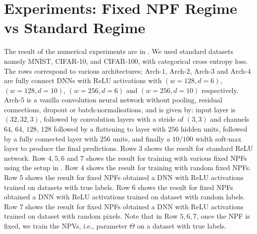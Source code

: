 \section{Experiments: Fixed NPF Regime vs  Standard Regime}\label{sec:generalisation}
The result of the numerical experiments are in . We used standard datasets namely MNIST, CIFAR-10, and CIFAR-100, with categorical cross entropy loss. The rows correspond to various architectures; Arch-$1$, Arch-$2$, Arch-$3$ and Arch-$4$ are fully connect DNNs with ReLU activations with $(w=128,d=6)$, $(w=128,d=10)$, $(w=256,d=6)$ and $(w=256,d=10)$ respectively. Arch-$5$ is a vanilla convolution neural network without pooling, residual connections, dropout or batch-normalisations, and is given by: input layer is $(32, 32, 3)$, followed by convolution layers with a stride of $(3, 3)$ and channels $64$, $64$, $128$, $128$ followed by a flattening to layer with $256$ hidden units, followed by a fully connected layer with $256$ units, and finally a  $10/100$ width soft-max layer to produce the final predictions. Rows $3$ shows the result for standard ReLU network. Row $4,5,6$ and $7$ shows the result for training with various fixed NPFs using the setup in . Row $4$ shows the result for training with random fixed NPFs. Row $5$ shows the result for fixed NPFs obtained a DNN with ReLU activations trained on datasets with true labels. Row $6$ shows the result for fixed NPFs obtained a DNN with ReLU activations trained on dataset with random labels. Row $7$ shows the result for fixed NPFs obtained a DNN with ReLU activations trained on dataset with random pixels. Note that in Row $5,6,7$, once the NPF is fixed, we train the NPVs, i.e., parameter $\Theta$ on a dataset with true labels.

